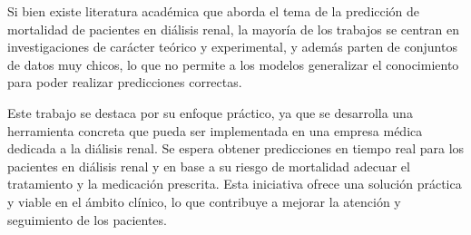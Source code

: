 Si bien existe literatura académica que aborda el tema de la predicción de mortalidad de pacientes en diálisis renal, la mayoría de los trabajos se centran en investigaciones de carácter teórico y experimental, y además parten de conjuntos de datos muy chicos, lo que no permite a los modelos generalizar el conocimiento para poder realizar predicciones correctas. 

Este trabajo se destaca por su enfoque práctico, ya que se desarrolla una herramienta concreta que pueda ser implementada en una empresa médica dedicada a la diálisis renal. Se espera obtener predicciones en tiempo real para los pacientes en diálisis renal y en base a su riesgo de mortalidad adecuar el tratamiento y la medicación prescrita. Esta iniciativa ofrece una solución práctica y viable en el ámbito clínico, lo que contribuye a mejorar la atención y seguimiento de los pacientes.

